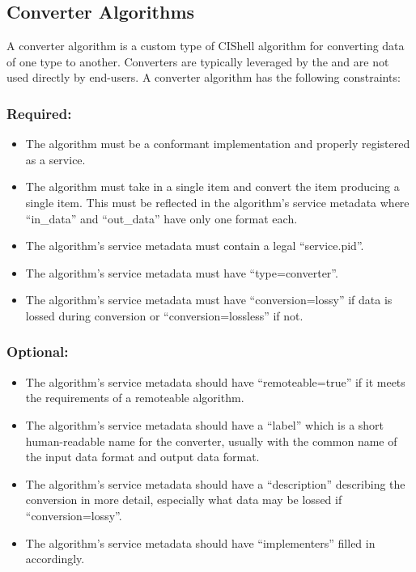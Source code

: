 \subsection{Converter Algorithms}
\label{converterAlg}

A converter algorithm is a custom type of CIShell algorithm for converting data
of one type to another. Converters are typically leveraged by the
 and are not used directly by end-users. A converter
algorithm has the following constraints:

\subsubsection*{Required:}
\begin{itemize}
  \item The algorithm must be a conformant 
  implementation and properly registered as a service.
  \item The algorithm must take in a single  item and convert the
  item producing a single  item. This must be reflected in the
  algorithm's service metadata where ``in\_data'' and ``out\_data'' have only
  one format each.
  \item The algorithm's service metadata must contain a legal ``service.pid''.
  \item The algorithm's service metadata must have ``type=converter''.
  \item The algorithm's service metadata must have ``conversion=lossy'' if
  data is lossed during conversion or ``conversion=lossless'' if not.
\end{itemize}

\subsubsection*{Optional:}
\begin{itemize}
  \item The algorithm's service metadata should have ``remoteable=true'' if it
  meets the requirements of a remoteable algorithm.
  \item The algorithm's service metadata should have a ``label'' which is a
  short human-readable name for the converter, usually with the common name of
  the input data format and output data format.
  \item The algorithm's service metadata should have a ``description''
  describing the conversion in more detail, especially what data may be lossed
  if ``conversion=lossy''.
  \item The algorithm's service metadata should have ``implementers'' filled
  in accordingly.  
\end{itemize}

